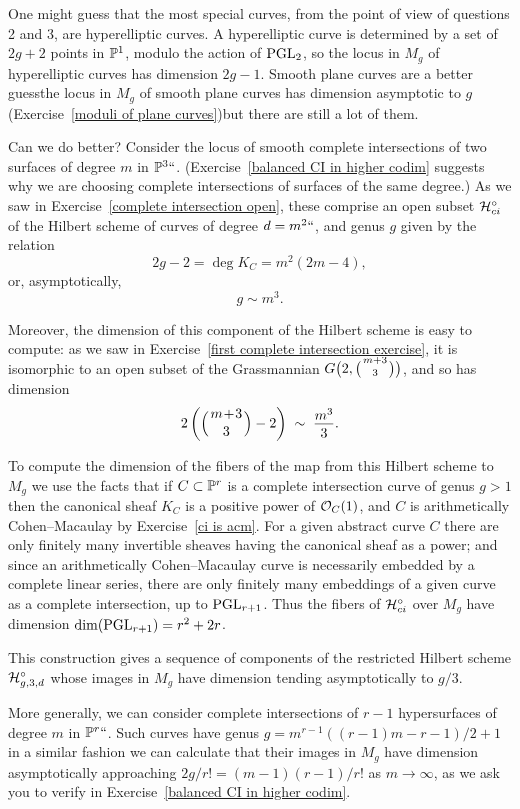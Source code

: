 One might guess that the most special curves, from the point of view of
questions 2 and 3, are hyperelliptic curves. A hyperelliptic curve is
determined by a set of $2g+2$ points in $\PP^{1}$, modulo the action of
%
$\PGL_{2}$,
so the locus in $M_g$ of 
%
hyperelliptic curves
 has dimension
$2g-1$. Smooth plane curves are a better guess\emdash  the locus in $M_g$ of
smooth plane curves has dimension asymptotic to $g$ (Exercise~\ref{moduli
of plane curves})\emdash but there are still a lot of them.

Can we do better?  Consider the locus of smooth complete intersections
of two surfaces of degree $m$ in $\PP^3` `$.
(Exercise~\ref{balanced CI in higher codim}
suggests why we are choosing complete
intersections of surfaces of the same degree.) As we saw in
Exercise~\ref{complete intersection open}, these comprise an open
%
subset $\cH^\circ_{ci}$ of the Hilbert scheme of curves of degree $d =
m^2` `$, and genus $g$ given by the relation
$$
2g-2 = \deg K_C = m^2(2m-4),
$$
or, asymptotically,
$$
g \sim m^3.
$$

Moreover, the dimension of this component of the Hilbert scheme is
easy to compute: as we saw in Exercise~\ref{first complete intersection
exercise},  it is isomorphic to an open subset of the Grassmannian
$G\bigl(2, \tbinom{m+3}{3}\bigr)$, and so has dimension
$$
2\left(\mbinom{m+3}{3} - 2\right) \; \sim \; \frac{m^3}{3}.
$$

To compute the dimension of the fibers of the map from this Hilbert
scheme to $M_{g}$ we use
the facts that if $C \subset \PP^r$ is a complete intersection curve
of genus $g >1$ then the canonical sheaf $K_C$ is a positive power
of $\cO_C(1)$, and  $C$ is
arithmetically Cohen--Macaulay by Exercise~\ref{ci is acm}.
%
For a given abstract curve $C$ there are only finitely many invertible
sheaves having the canonical sheaf as a power; and since an arithmetically
Cohen--Macaulay curve is necessarily embedded by a complete linear series,
there are only finitely many embeddings of a given curve as a complete
intersection, up to $\PGL_{r+1}$. Thus the fibers of $\cH^\circ_{ci}$
over $M_g$ have dimension $\dim(\PGL_{r+1}) = r^2 + 2r$.

This construction gives 
a sequence of components of the restricted
Hilbert scheme $\cH^\circ_{g,3,d}$ whose images in $M_g$ have dimension
%
tending asymptotically to $g/3$.

More generally, we can consider 
complete intersections
%
of $r-1$
hypersurfaces of degree $m$ in $\PP^r` `$. Such curves have
genus $g = m^{r-1}((r-1)m-r-1)/2 +1$ in a similar fashion we can calculate
that their images in $M_g$ have dimension asymptotically approaching
$2g/r!= (m-1)(r-1)/r!$
 as $m \to \infty$, as we ask you to verify in Exercise~\ref{balanced
 CI in higher codim}.


